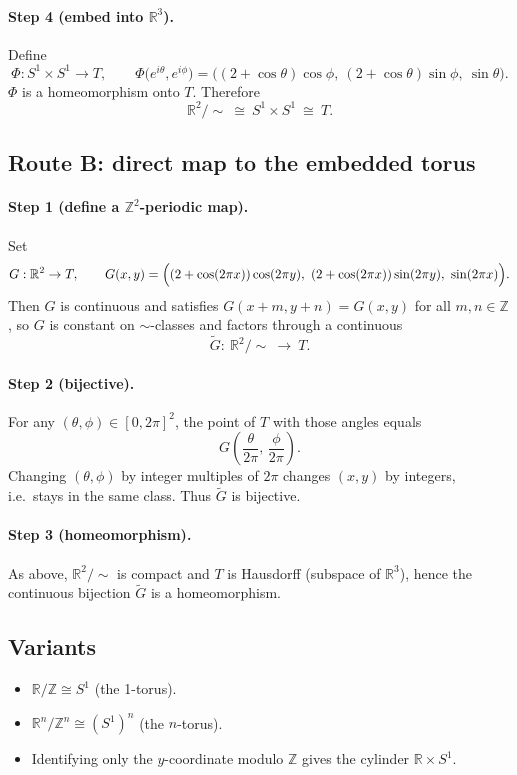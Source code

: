 \documentclass[12pt,a4paper]{article}
\theoremstyle{plain}
\theoremstyle{definition}
\theoremstyle{remark}
\theoremstyle{remark}
\begin{document}
	\paragraph{Step 4 (embed into $\mathbb{R}^3$).}
	Define
	\[
	\Phi: S^1\times S^1\to T,\qquad
	\Phi\bigl(e^{i\theta},e^{i\phi}\bigr)
	=\bigl((2+\cos\theta)\cos\phi,\ (2+\cos\theta)\sin\phi,\ \sin\theta\bigr).
	\]
	$\Phi$ is a homeomorphism onto $T$. Therefore
	\[
	\mathbb{R}^2/\!\sim\ \cong\ S^1\times S^1\ \cong\ T.
	\]
	
	\bigskip
	
	\subsection*{Route B: direct map to the embedded torus}
	\paragraph{Step 1 (define a $\mathbb{Z}^2$-periodic map).}
	Set
	\[
	G:\mathbb{R}^2\to T,\qquad
	G(x,y)=\Bigl((2+\cos(2\pi x))\cos(2\pi y),\ (2+\cos(2\pi x))\sin(2\pi y),\ \sin(2\pi x)\Bigr).
	\]
	Then $G$ is continuous and satisfies $G(x+m,y+n)=G(x,y)$ for all $m,n\in\mathbb{Z}$, so $G$ is constant on $\sim$-classes and factors through a continuous
	\[
	\tilde G:\ \mathbb{R}^2/\!\sim\ \longrightarrow\ T.
	\]
	
	\paragraph{Step 2 (bijective).}
	For any $(\theta,\phi)\in[0,2\pi]^2$, the point of $T$ with those angles equals
	\[
	G\!\left(\frac{\theta}{2\pi},\,\frac{\phi}{2\pi}\right).
	\]
	Changing $(\theta,\phi)$ by integer multiples of $2\pi$ changes $(x,y)$ by integers, i.e.\ stays in the same class.
	Thus $\tilde G$ is bijective.
	
	\paragraph{Step 3 (homeomorphism).}
	As above, $\mathbb{R}^2/\!\sim$ is compact and $T$ is Hausdorff (subspace of $\mathbb{R}^3$), hence the continuous bijection $\tilde G$ is a homeomorphism.
	
	\bigskip
	
	\subsection*{Variants}
	\begin{itemize}
		\item $\mathbb{R}/\mathbb{Z}\cong S^1$ (the 1-torus).
		\item $\mathbb{R}^n/\mathbb{Z}^n\cong (S^1)^n$ (the $n$-torus).
		\item Identifying only the $y$-coordinate modulo $\mathbb{Z}$ gives the cylinder $\mathbb{R}\times S^1$.
	\end{itemize}
	
\end{document}
